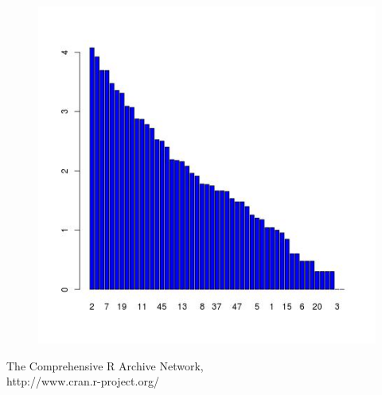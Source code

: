 \documentclass[11pt]{scrartcl}
\begin{document}
\begin{figure}[H]
    \begin{center}
    \centering
    \includegraphics[scale=0.7]{scripts/barplot_audacity.jpg}
    \caption{}
    \label{fig:commits}
    \end{center}
\end{figure}

\begin{thebibliography}{9}

  The Comprehensive R Archive Network,\\
  http://www.cran.r-project.org/

\end{thebibliography}
\end{document}
